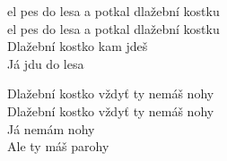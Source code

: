 
\ve{}
el pes do lesa a potkal dlažební kostku\\
el pes do lesa a potkal dlažební kostku\\
Dlažební kostko kam jdeš\\
Já jdu do lesa 

\ve{}
Dlažební kostko vždyť ty nemáš nohy\\
Dlažební kostko vždyť ty nemáš nohy\\
Já nemám nohy\\
Ale ty máš parohy 

\esong{}